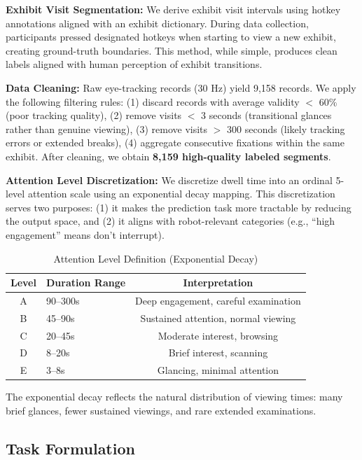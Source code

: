 \documentclass[letterpaper]{article}
\begin{document}
\textbf{Exhibit Visit Segmentation:} We derive exhibit visit intervals using hotkey annotations aligned with an exhibit dictionary. During data collection, participants pressed designated hotkeys when starting to view a new exhibit, creating ground-truth boundaries. This method, while simple, produces clean labels aligned with human perception of exhibit transitions.

\textbf{Data Cleaning:} Raw eye-tracking records (30 Hz) yield 9,158 records. We apply the following filtering rules: (1) discard records with average validity $<$ 60\% (poor tracking quality), (2) remove visits $<$ 3 seconds (transitional glances rather than genuine viewing), (3) remove visits $>$ 300 seconds (likely tracking errors or extended breaks), (4) aggregate consecutive fixations within the same exhibit. After cleaning, we obtain \textbf{8,159 high-quality labeled segments}.

\textbf{Attention Level Discretization:} We discretize dwell time into an ordinal 5-level attention scale using an exponential decay mapping. This discretization serves two purposes: (1) it makes the prediction task more tractable by reducing the output space, and (2) it aligns with robot-relevant categories (e.g., ``high engagement'' means don't interrupt).

\begin{table}[h]
\centering
\caption{Attention Level Definition (Exponential Decay)}
\begin{tabular}{clc}
\toprule
Level & Duration Range & Interpretation \\
\midrule
A & 90--300s & Deep engagement, careful examination \\
B & 45--90s & Sustained attention, normal viewing \\
C & 20--45s & Moderate interest, browsing \\
D & 8--20s & Brief interest, scanning \\
E & 3--8s & Glancing, minimal attention \\
\bottomrule
\end{tabular}
\label{tab:attention}
\end{table}

The exponential decay reflects the natural distribution of viewing times: many brief glances, fewer sustained viewings, and rare extended examinations.

\subsection{Task Formulation}
\end{document}
